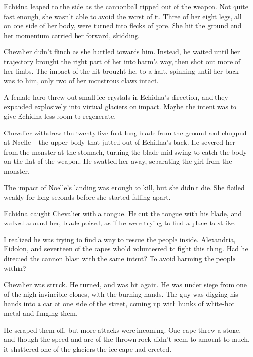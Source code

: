 Echidna leaped to the side as the cannonball ripped out of the weapon.  Not quite fast enough, she wasn't able to avoid the worst of it.  Three of her eight legs, all on one side of her body, were turned into flecks of gore.  She hit the ground and her momentum carried her forward, skidding.



Chevalier didn't flinch as she hurtled towards him.  Instead, he waited until her trajectory brought the right part of her into harm's way, then shot out more of her limbs.  The impact of the hit brought her to a halt, spinning until her back was to him, only two of her monstrous claws intact.



A female hero threw out small ice crystals in Echidna's direction, and they expanded explosively into virtual glaciers on impact.  Maybe the intent was to give Echidna less room to regenerate.



Chevalier withdrew the twenty-five foot long blade from the ground and chopped at Noelle – the upper body that jutted out of Echidna's back.  He severed her from the monster at the stomach, turning the blade mid-swing to catch the body on the flat of the weapon. He swatted her away, separating the girl from the monster.



The impact of Noelle's landing was enough to kill, but she didn't die.  She flailed weakly for long seconds before she started falling apart.



Echidna caught Chevalier with a tongue.  He cut the tongue with his blade, and walked around her, blade poised, as if he were trying to find a place to strike.



I realized he was trying to find a way to rescue the people inside.  Alexandria, Eidolon, and seventeen of the capes who'd volunteered to fight this thing.  Had he directed the cannon blast with the same intent?  To avoid harming the people within?



Chevalier was struck.  He turned, and was hit again.  He was under siege from one of the nigh-invincible clones, with the burning hands.  The guy was digging his hands into a car at one side of the street, coming up with hunks of white-hot metal and flinging them.



He scraped them off, but more attacks were incoming.  One cape threw a stone, and though the speed and arc of the thrown rock didn't seem to amount to much, it shattered one of the glaciers the ice-cape had erected.



